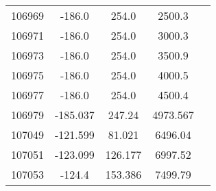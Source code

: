\begin{table}[ht]
\begin{tabular*}{90mm}{c@{\extracolsep{\fill}}*4c}
        106969 & -186.0 & 254.0 & 2500.3\\
        106971 & -186.0 & 254.0 & 3000.3\\
        106973 & -186.0 & 254.0 & 3500.9\\
        106975 & -186.0 & 254.0 & 4000.5\\
        106977 & -186.0 & 254.0 & 4500.4\\
        106979 & -185.037 & 247.24 & 4973.567\\
        107049 & -121.599 & 81.021 & 6496.04 \\
        107051 & -123.099 & 126.177 & 6997.52\\
        107053	&	-124.4 & 153.386 & 7499.79\\
        \bottomrule	
	\end{tabular*}
\end{table}
        
